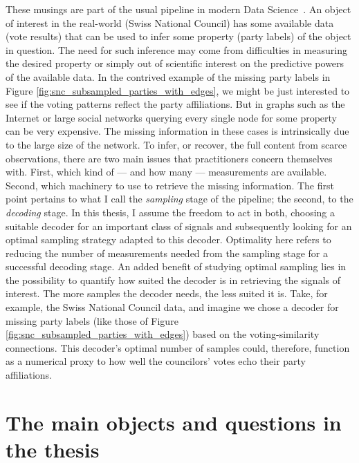These musings are part of the usual pipeline in modern Data Science~\cite{vanderaalst2016}. An object of interest in the real-world (Swiss National Council) has some available data (vote results) that can be used to infer some property (party labels) of the object in question. The need for such inference may come from difficulties in measuring the desired property or simply out of scientific interest on the predictive powers of the available data. In the contrived example of the missing party labels in Figure \ref{fig:snc_subsampled_parties_with_edges}, we might be just interested to see if the voting patterns reflect the party affiliations. But in graphs such as the Internet or large social networks querying every single node for some property can be very expensive. The missing information in these cases is intrinsically due to the large size of the network. To infer, or recover, the full content from scarce observations, there are two main issues that practitioners concern themselves with. First, which kind of --- and how many --- measurements are available. Second, which machinery to use to retrieve the missing information. The first point pertains to what I call the \emph{sampling} stage of the pipeline; the second, to the \emph{decoding} stage. In this thesis, I assume the freedom to act in both, choosing a suitable decoder for an important class of signals and subsequently looking for an optimal sampling strategy adapted to this decoder. Optimality here refers to reducing the number of measurements needed from the sampling stage for a successful decoding stage. An added benefit of studying optimal sampling lies in the possibility to quantify how suited the decoder is in retrieving the signals of interest. The more samples the decoder needs, the less suited it is. Take, for example, the Swiss National Council data, and imagine we chose a decoder for missing party labels (like those of Figure \ref{fig:snc_subsampled_parties_with_edges}) based on the voting-similarity connections. This decoder's optimal number of samples could, therefore, function as a numerical proxy to how well the councilors' votes echo their party affiliations.


\section{The main objects and questions in the thesis}

